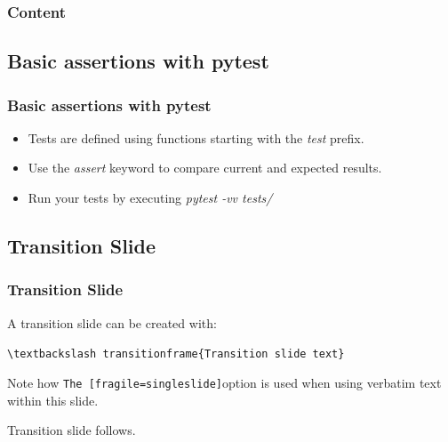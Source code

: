 \documentclass[t]{beamer}
\begin{document}
\begin{frame}
  \frametitle{Content}
  \tableofcontents[currentsection]
  \vspace{200pt}  %
\end{frame}


\subsection{Basic assertions with pytest}
\begin{frame}[fragile=singleslide]  %
  \frametitle{Basic assertions with pytest}

   \begin{itemize}
        \item Tests are defined using functions starting with the \textit{test} prefix.
        \item Use the \textit{assert} keyword to compare current and expected results.
        \item Run your tests by executing \textit{pytest -vv tests/}
   \end{itemize}

\end{frame}



\subsection{Transition Slide}
\begin{frame}[fragile=singleslide]
  \frametitle{Transition Slide}

  A transition slide can be created with:
  \vspace{\baselineskip}

  \verb|\textbackslash transitionframe{Transition slide text}|
  \vspace{\baselineskip}

  Note how \verb|The [fragile=singleslide]|option is used when using verbatim
  text within this slide.
  \vspace{\baselineskip}

  Transition slide follows.

\end{frame}


\end{document}
